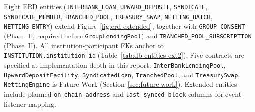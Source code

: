 \documentclass[12pt,a4paper]{report}
\begin{document}
Eight ERD entities (\texttt{INTERBANK\_LOAN}, \texttt{UPWARD\_DEPOSIT}, \texttt{SYNDICATE}, \texttt{SYNDICATE\_MEMBER}, \texttt{TRANCHED\_POOL}, \texttt{TREASURY\_SWAP}, \texttt{NETTING\_BATCH}, \texttt{NETTING\_ENTRY}) extend Figure~\ref{fig:erd-extended}, together with \texttt{GROUP\_CONSENT} (Phase~II, required before \texttt{GroupLendingPool}) and \texttt{TRANCHED\_POOL\_SUBSCRIPTION} (Phase~II). All institution-participant FKs anchor to \texttt{INSTITUTION.institution\_id} (Table~\ref{tab:db-entities-ext2}). Five contracts are specified at implementation depth in this report: \texttt{InterBankLendingPool}, \texttt{UpwardDepositFacility}, \texttt{SyndicatedLoan}, \texttt{TranchedPool}, and \texttt{TreasurySwap}; \texttt{NettingEngine} is Future Work (Section~\ref{sec:future-work}). Extended entities include planned \texttt{on\_chain\_address} and \texttt{last\_synced\_block} columns for event-listener mapping.
\end{document}
